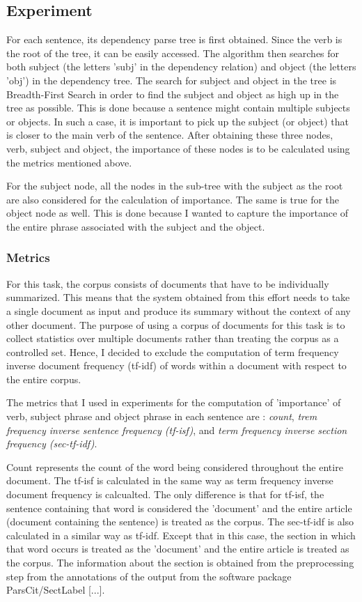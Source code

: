 \subsection{Experiment}
For each sentence, its dependency parse tree is first obtained.
Since the verb is the root of the tree, it can be easily accessed.
The algorithm then searches for both subject (the letters 'subj' in the dependency relation) and object (the letters 'obj') in the dependency tree.
The search for subject and object in the tree is Breadth-First Search in order to find the subject and object as high up in the tree as possible.
This is done because a sentence might contain multiple subjects or objects.
In such a case, it is important to pick up the subject (or object) that is closer to the main verb of the sentence.
After obtaining these three nodes, verb, subject and object, the importance of these nodes is to be calculated using the metrics mentioned above.

For the subject node, all the nodes in the sub-tree with the subject as the root are also considered for the calculation of importance.
The same is true for the object node as well.
This is done because I wanted to capture the importance of the entire phrase associated with the subject and the object.

\subsubsection*{Metrics}
For this task, the corpus consists of documents that have to be individually summarized.
This means that the system obtained from this effort needs to take a single document as input and produce its summary without the context of any other document.
The purpose of using a corpus of documents for this task is to collect statistics over multiple documents rather than treating the corpus as a controlled set.
Hence, I decided to exclude the computation of term frequency inverse document frequency (tf-idf) of words within a document with respect to the entire corpus.

The metrics that I used in experiments for the computation of 'importance' of verb, subject phrase and object phrase in each sentence are : \textit{count}, \textit{trem frequency inverse sentence frequency (tf-isf)}, and \textit{term frequency inverse section frequency (sec-tf-idf)}.

Count represents the count of the word being considered throughout the entire document.
The tf-isf is calculated in the same way as term frequency inverse document frequency is calcualted. The only difference is that for tf-isf, the sentence containing that word is considered the 'document' and the entire article (document containing the sentence) is treated as the corpus.
The sec-tf-idf is also calculated in a similar way as tf-idf.
Except that in this case, the section in which that word occurs is treated as the 'document' and the entire article is treated as the corpus.
The information about the section is obtained from the preprocessing step from the annotations of the output from the software package ParsCit/SectLabel [...].

